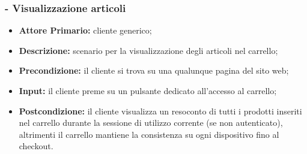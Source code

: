\stepsubUserCase
\subsubsection{ - Visualizzazione articoli}
\begin{itemize}
    \item \textbf{Attore Primario:} cliente generico;
    \item \textbf{Descrizione:} scenario per la visualizzazione degli articoli nel carrello;
    \item \textbf{Precondizione:} il cliente si trova su una qualunque pagina del sito web;
    \item \textbf{Input:} il cliente preme su un pulsante dedicato all'accesso al carrello;
    \item \textbf{Postcondizione:} il cliente visualizza un resoconto di tutti i prodotti inseriti nel carrello durante
          la sessione di utilizzo corrente (se non autenticato), altrimenti il carrello mantiene la consistenza
          su ogni dispositivo fino al checkout.
\end{itemize}

\stepsubUserCase
